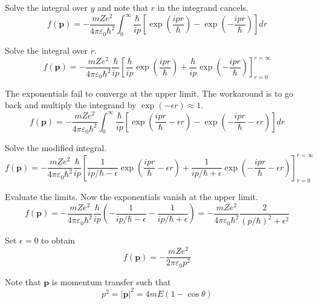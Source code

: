 Solve the integral over $y$ and note that $r$ in the integrand cancels.
\begin{equation*}
f(\mathbf p)=-\frac{mZe^2}{4\pi\varepsilon_0\hbar^2}
\int_0^\infty
\frac{\hbar}{ip}
\left[\exp\left(\frac{ipr}{\hbar}\right)-\exp\left(-\frac{ipr}{\hbar}\right)\right]
dr
\end{equation*}

Solve the integral over $r$.
\begin{equation*}
f(\mathbf p)
=-\frac{mZe^2}{4\pi\varepsilon_0\hbar^2}\frac{\hbar}{ip}
\left[
\frac{\hbar}{ip}
\exp\left(\frac{ipr}{\hbar}\right)
+\frac{\hbar}{ip}
\exp\left(-\frac{ipr}{\hbar}\right)
\right]_{r=0}^{r=\infty}
\end{equation*}

The exponentials fail to converge at the upper limit.
The workaround is to go back and multiply the integrand by $\exp(-\epsilon r)\approx1$.
\begin{equation*}
f(\mathbf p)=-\frac{mZe^2}{4\pi\varepsilon_0\hbar^2}
\int_0^\infty
\frac{\hbar}{ip}
\left[\exp\left(\frac{ipr}{\hbar}-\epsilon r\right)
-\exp\left(-\frac{ipr}{\hbar}-\epsilon r\right)\right]
dr
\end{equation*}

Solve the modified integral.
\begin{equation*}
f(\mathbf p)=-\frac{mZe^2}{4\pi\varepsilon_0\hbar^2}
\frac{\hbar}{ip}
\left[
\frac{1}{ip/\hbar-\epsilon}\exp\left(\frac{ipr}{\hbar}-\epsilon r\right)
+\frac{1}{ip/\hbar+\epsilon}\exp\left(-\frac{ipr}{\hbar}-\epsilon r\right)
\right]_{r=0}^{r=\infty}
\end{equation*}

Evaluate the limits. Now the exponentials vanish at the upper limit.
\begin{equation*}
f(\mathbf p)=-\frac{mZe^2}{4\pi\varepsilon_0\hbar^2}
\frac{\hbar}{ip}
\left(-\frac{1}{ip/\hbar-\epsilon}-\frac{1}{ip/\hbar+\epsilon}\right)
=-\frac{mZe^2}{4\pi\varepsilon_0\hbar^2}\frac{2}{(p/\hbar)^2+\epsilon^2}
\tag{1}
\end{equation*}

Set $\epsilon=0$ to obtain
\begin{equation*}
f(\mathbf p)=-\frac{mZe^2}{2\pi\varepsilon_0p^2}
\end{equation*}

Note that $\mathbf p$ is momentum transfer such that
\begin{equation*}
p^2=|\mathbf p|^2=4mE(1-\cos\theta)
\end{equation*}

